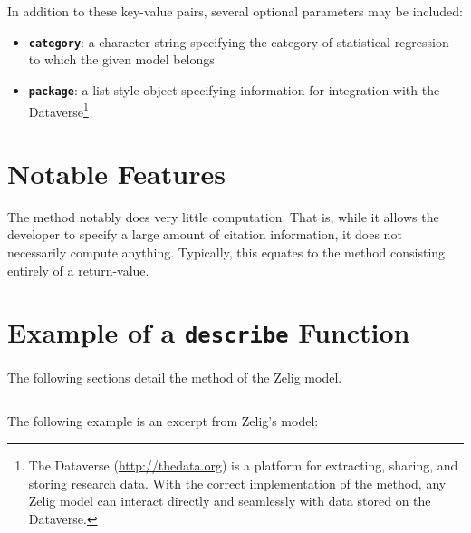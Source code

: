 {\noindent}In addition to these key-value pairs, several optional parameters may be included:

\begin{itemize}
  \item {\bf \tt category}: a character-string specifying the category of statistical regression to which the given model belongs
  \item {\bf \tt package}: a list-style object specifying information for integration with the Dataverse\footnote{The Dataverse (\url{http://thedata.org}) is a platform for extracting, sharing, and storing research data. With the correct implementation of the  method, any Zelig model can interact directly and seamlessly with data stored on the Dataverse.}
\end{itemize}



\section{ Notable Features}
\label{section:describe-notable}

The  method notably does very little computation. That is, while it allows the developer to specify a large amount of citation information, it does not necessarily compute anything. Typically, this equates to the  method consisting entirely of a return-value.







\section{Example of a {\tt describe} Function}

The following sections detail the  method of the  Zelig model.

\subsection{}
The following example is an excerpt from Zelig's  model:

